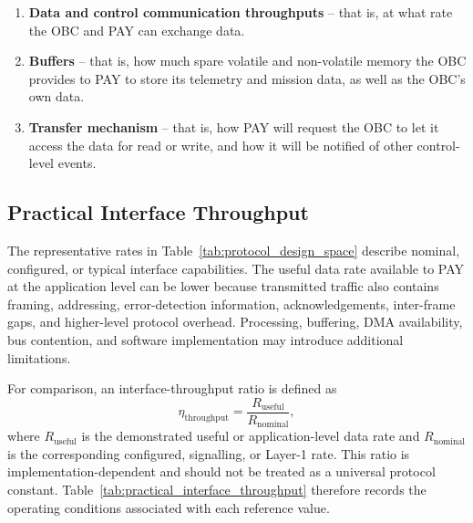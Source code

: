 \documentclass[10pt]{../datasheet}
\begin{document}
\begin{enumerate}
  \item \textbf{Data and control communication throughputs} -- that is, at what
        rate the OBC and PAY can exchange data.
  \item \textbf{Buffers} -- that is, how much spare volatile and non-volatile
        memory the OBC provides to PAY to store its telemetry and mission data,
        as well as the OBC's own data.
  \item \textbf{Transfer mechanism} -- that is, how PAY will request the OBC to
        let it access the data for read or write, and how it will be notified of
        other control-level events.
\end{enumerate}

\subsection*{Practical Interface Throughput}

The representative rates in Table~\ref{tab:protocol_design_space} describe
nominal, configured, or typical interface capabilities. The useful data rate
available to PAY at the application level can be lower because transmitted
traffic also contains framing, addressing, error-detection information,
acknowledgements, inter-frame gaps, and higher-level protocol overhead.
Processing, buffering, DMA availability, bus contention, and software
implementation may introduce additional limitations.

For comparison, an interface-throughput ratio is defined as
\begin{equation}
  \eta_{\mathrm{throughput}}
  =
  \frac{R_{\mathrm{useful}}}{R_{\mathrm{nominal}}},
\end{equation}
where $R_{\mathrm{useful}}$ is the demonstrated useful or application-level data
rate and $R_{\mathrm{nominal}}$ is the corresponding configured, signalling, or
Layer-1 rate. This ratio is implementation-dependent and should not be treated
as a universal protocol constant. Table~\ref{tab:practical_interface_throughput}
therefore records the operating conditions associated with each reference value.
\end{document}
